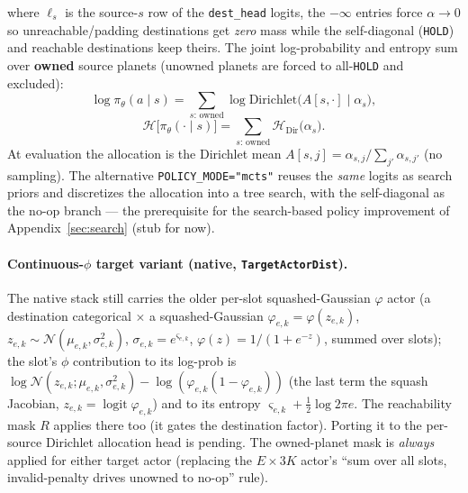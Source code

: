 \documentclass[11pt]{article}
\newcommand{\pol}{\pi_\theta}
\begin{document}
where $\ell_{s}$ is the source-$s$ row of the \texttt{dest\_head} logits, the $-\infty$ entries force
$\alpha\to 0$ so unreachable/padding destinations get \emph{zero} mass while the self-diagonal
(\texttt{HOLD}) and reachable destinations keep theirs. The joint log-probability and entropy sum over
\textbf{owned} source planets (unowned planets are forced to all-\texttt{HOLD} and excluded):
\begin{equation}
\log\pol(a\mid s) = \sum_{s:\,\text{owned}} \log\mathrm{Dirichlet}\big(A[s,\cdot]\mid\alpha_{s}\big),
\label{eq:logp}
\end{equation}
\begin{equation}
\mathcal{H}\big[\pol(\cdot\mid s)\big] = \sum_{s:\,\text{owned}}
\mathcal H_{\mathrm{Dir}}\big(\alpha_{s}\big).
\label{eq:ent}
\end{equation}
At evaluation the allocation is the Dirichlet mean $A[s,j]=\alpha_{s,j}/\sum_{j'}\alpha_{s,j'}$ (no
sampling). The alternative \texttt{POLICY\_MODE="mcts"} reuses the \emph{same} logits as search priors
and discretizes the allocation into a tree search, with the self-diagonal as the no-op branch --- the
prerequisite for the search-based policy improvement of Appendix~\ref{sec:search} (stub for now).

\paragraph{Continuous-$\phi$ target variant (native, \texttt{TargetActorDist}).} The native stack
still carries the older per-slot squashed-Gaussian $\varphi$ actor (a destination categorical
$\times$ a squashed-Gaussian $\varphi_{e,k}=\varphi(z_{e,k})$, $z_{e,k}\sim\mathcal
N(\mu_{e,k},\sigma_{e,k}^2)$, $\sigma_{e,k}=e^{\varsigma_{e,k}}$, $\varphi(z)=1/(1+e^{-z})$, summed over
slots); the slot's $\phi$ contribution to its log-prob is
$\log\mathcal N(z_{e,k};\mu_{e,k},\sigma_{e,k}^2)-\log(\varphi_{e,k}(1-\varphi_{e,k}))$ (the last term
the squash Jacobian, $z_{e,k}=\operatorname{logit}\varphi_{e,k}$) and to its entropy
$\varsigma_{e,k}+\tfrac12\log2\pi e$. The reachability mask $R$ applies there too (it gates the
destination factor). Porting it to the per-source Dirichlet allocation head is pending. The
owned-planet mask is \emph{always} applied for either target actor (replacing the $E{\times}3K$ actor's
``sum over all slots, invalid-penalty drives unowned to no-op'' rule).
\end{document}
